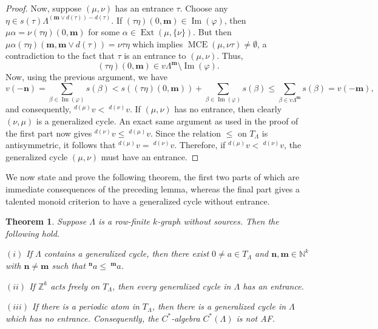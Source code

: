 \documentclass[a4paper,reqno,12pt]{amsart}
\numberwithin{equation}{section}
\newtheorem{thm}{Theorem}[subsection]
\theoremstyle{definition}
\theoremstyle{remark}
\newcommand{\image}{\operatorname{Im}}
\newcommand{\Ext}{\operatorname{Ext}}
\newcommand{\MCE}{\operatorname{MCE}}
\newcommand{\N}{\mathbf{n}}
\newcommand{\M}{\mathbf{m}}
\begin{document}
\begin{proof}
Now, suppose $(\mu,\nu)$ has an entrance $\tau$. Choose any $\eta\in s(\tau)\Lambda^{(\M\vee d(\tau))-d(\tau)}$. If $(\tau\eta)(0,\M)\in \image(\varphi)$, then $\mu\alpha=\nu (\tau\eta)(0,\M)$ for some $\alpha\in \Ext(\mu,\{\nu\})$. But then $\mu\alpha(\tau\eta)(\M,\M\vee d(\tau))=\nu\tau\eta$ which implies $\MCE(\mu,\nu\tau)\neq \emptyset$, a contradiction to the fact that $\tau$ is an entrance to $(\mu,\nu)$. Thus, \[(\tau\eta)(0,\M)\in v\Lambda^\M\setminus \image(\varphi).\] Now, using the previous argument, we have \[v(-\N)=\displaystyle{\sum_{\beta\in \image(\varphi)}}s(\beta)<s((\tau\eta)(0,\M))+\displaystyle{\sum_{\beta\in \image(\varphi)}}s(\beta)\le \displaystyle{\sum_{\beta\in v\Lambda^\M}} s(\beta)=v(-\M),\] and consequently, $^{d(\mu)}v<~^{d(\nu)}v$. If $(\mu,\nu)$ has no entrance, then clearly $(\nu,\mu)$ is a generalized cycle. An exact same argument as used in the proof of the first part now gives $^{d(\nu)}v\le~^{d(\mu)}v$. Since the relation $\le$ on $T_\Lambda$ is antisymmetric, it follows that $^{d(\mu)}v=~^{d(\nu)}v$. Therefore, if $^{d(\mu)}v<~^{d(\nu)}v$, the generalized cycle $(\mu,\nu)$ must have an entrance. 
\end{proof}
We now state and prove the following theorem, the first two parts of which are immediate consequences of the preceding lemma, whereas the final part gives a talented monoid criterion to have a generalized cycle without entrance. 
\begin{thm}\label{th existence of generalized cycle via TM}
Suppose $\Lambda$ is a row-finite $k$-graph without sources. Then the following hold.

$(i)$ If $\Lambda$ contains a generalized cycle, then there exist $0\neq a\in T_\Lambda$ and $\N,\M\in \mathbb{N}^k$ with $\N\neq \M$ such that $^\N a\le~^\M a$. 

$(ii)$ If $\mathbb{Z}^k$ acts freely on $T_\Lambda$, then every generalized cycle in $\Lambda$ has an entrance.

$(iii)$ If there is a periodic atom in $T_\Lambda$, then there is a generalized cycle in $\Lambda$ which has no entrance. Consequently, the $C^*$-algebra $C^*(\Lambda)$ is not AF. 
\end{thm}
\end{document}
